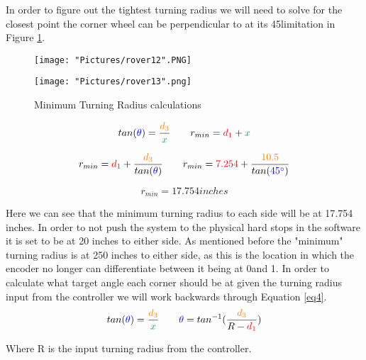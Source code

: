 \documentclass[12pt]{article}
\begin{document}
\noindent In order to figure out the tightest turning radius we will need to solve for the closest point the corner wheel can be perpendicular to at its 45\degree limitation in Figure \ref{r8}.

\begin{figure}[H]
 	\centering
  	\begin{minipage}[b]{0.45\textwidth}
		\texttt{[image: "Pictures/rover12".PNG]}
  	\end{minipage}
  	\hfill
  	\begin{minipage}[b]{0.45\textwidth}
    		\texttt{[image: "Pictures/rover13".png]}
  	\end{minipage}
  	\caption{Minimum Turning Radius calculations}
	\label{r8}
\end{figure}


\begin{equation}
	tan(\textcolor{blue}{\theta}) = \frac{\textcolor{orange}{d_3}}{\textcolor{ForestGreen}{x}} \qquad  r_{min} = \textcolor{red}{d_1} + \textcolor{ForestGreen}{x} 
	\label{eq4}
\end{equation}

\begin{equation}
	r_{min} = \textcolor{red}{d_1} + \frac{\textcolor{orange}{d_3}}{tan(\textcolor{blue}{\theta})} \qquad   r_{min} = \textcolor{red}{7.254} + \frac{\textcolor{orange}{10.5}}{tan(\textcolor{blue}{45\degree})}
\end{equation}

\begin{equation}
	r_{min} = 17.754 inches
\end{equation}

\noindent Here we can see that the minimum turning radius to each side will be at 17.754 inches. In order to not push the system to the physical hard stops in the software it is set to be at 20 inches to either side. As mentioned before the "minimum" turning radius is at 250 inches to either side, as this is the location in which the encoder no longer can differentiate between it being at 0\degree and 1\degree. In order to calculate what target angle each corner should be at given the turning radius input from the controller we will work backwards through Equation \ref{eq4}.
\begin{equation}
	tan(\textcolor{blue}{\theta}) = \frac{\textcolor{orange}{d_3}}{\textcolor{ForestGreen}{x}} \qquad \textcolor{blue}{\theta} = tan^{-1}(\frac{\textcolor{orange}{d_3}}{R - \textcolor{red}{d_1}})
\end{equation}

\noindent Where R is the input turning radius from the controller. 
\end{document}
